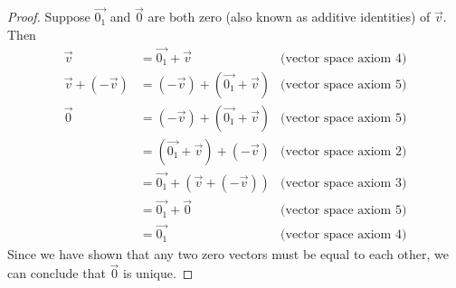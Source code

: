 \documentclass[12pt]{article}
\begin{document}
\begin{enumerate}
\begin{proof}
                      Suppose $\vec{0_1}$ and $\vec{0}$ are both zero (also known as additive identities) of $\vec{v}$. Then
                      \begin{align*}
                              \vec{v}             & = \vec{0_1} + \vec{v}                & \textrm{(vector space axiom 4)} \\
                              \vec{v} +(-\vec{v}) & = (-\vec{v}) + (\vec{0_1} + \vec{v}) & \textrm{(vector space axiom 5)} \\
                              \vec{0}             & = (-\vec{v}) + (\vec{0_1} + \vec{v}) & \textrm{(vector space axiom 5)} \\
                                                  & = (\vec{0_1} + \vec{v}) + (-\vec{v}) & \textrm{(vector space axiom 2)} \\
                                                  & = \vec{0_1} + (\vec{v} + (-\vec{v})) & \textrm{(vector space axiom 3)} \\
                                                  & = \vec{0_1} + \vec{0}                & \textrm{(vector space axiom 5)} \\
                                                  & = \vec{0_1}                          & \textrm{(vector space axiom 4)}
                      \end{align*}
                      Since we have shown that any two zero vectors must be equal to each other,
                      we can conclude that $\vec{0}$ is unique.
              \end{proof}
\end{enumerate}
\end{document}
